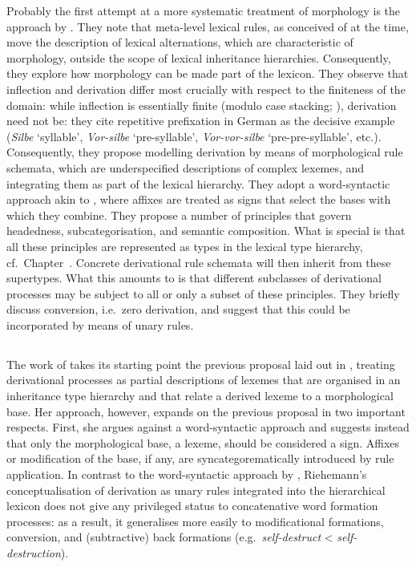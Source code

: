 \documentclass[output=paper
 	        ,biblatex
                ,babelshorthands
                ,newtxmath
                ,draftmode
                ,colorlinks, citecolor=brown
]{langscibook}
\begin{document}
Probably the first attempt at a more systematic treatment of
morphology is the approach by \citet{Krieger:Nerbonne:93}. They note
that meta-level lexical rules, as conceived of at the time, move the
description of lexical alternations, which are characteristic of
morphology, outside the scope of lexical inheritance
hierarchies. Consequently, they explore how morphology can be made
part of the lexicon. They observe that inflection and derivation
differ most crucially with respect to the finiteness of the domain:
while inflection is essentially finite (modulo case stacking;
\citealp{Sadler06,malouf:head-driven}), derivation need not be:
they cite repetitive prefixation in German as the decisive example
(\textit{Silbe} `syllable', \textit{Vor-silbe} `pre-syllable',
\textit{Vor-vor-silbe} `pre-pre-syllable', etc.). Consequently, they
propose  modelling derivation by means of morphological rule schemata,
which are underspecified descriptions of complex lexemes, and
integrating them as part of the lexical hierarchy. They adopt a
word-syntactic approach akin to \citet{Lieber92}, where affixes are
treated as signs that select the bases with which they combine. They
propose a number of principles that govern headedness,
subcategorisation, and semantic composition. What is special is that
all these principles are represented as types in the lexical type
hierarchy, cf.\ Chapter~. Concrete
derivational rule schemata will then inherit from these
supertypes. What this amounts to is that different subclasses of
derivational processes may be subject to all or only a subset of these
principles. They briefly discuss conversion, i.e.\ zero derivation, and
suggest that this could be incorporated by means of unary rules.



\subsection{\texorpdfstring{\protect\citet{Riehemann98}}{Riehemann (1998)}}
\label{morphology:sec-Riehemann}

The work of \citet{Riehemann98} takes its starting point the
previous proposal laid out in \citet{Krieger:Nerbonne:93}, treating
derivational processes as partial descriptions of lexemes that are
organised in an inheritance type hierarchy and that relate a derived
lexeme to a morphological base.  Her approach, however, expands on the
previous proposal in two important respects. First, she argues against
a word-syntactic approach and suggests instead that only the
morphological base, a lexeme, should be considered a sign. Affixes or
modification of the base, if any, are syncategorematically introduced
by rule application. In contrast to the word-syntactic approach by
\citet{Krieger:Nerbonne:93}, Riehemann's conceptualisation of
derivation as unary rules integrated into the hierarchical lexicon
does not give any privileged status to concatenative word formation
processes: as a result, it generalises more easily to modificational
formations, conversion, and  (subtractive) back formations
(e.g.\ \textit{self-destruct} < \textit{self-destruction}). 
\end{document}
